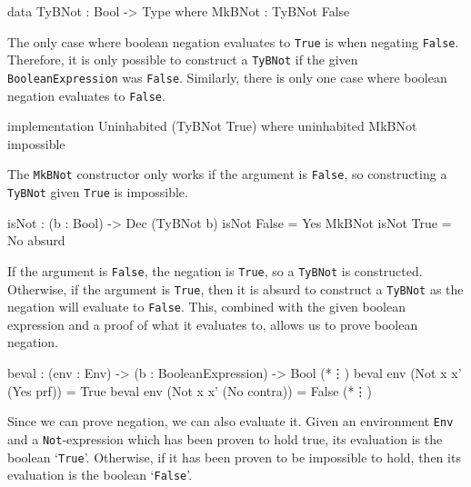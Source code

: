     \begin{code}[caption={The case where \texttt{Not} would evaluate to \texttt{True}}]
            data TyBNot : Bool -> Type where
                MkBNot  : TyBNot False
    \end{code}
    
    The only case where boolean negation evaluates to \texttt{True} is when negating \texttt{False}. Therefore, it is only possible to construct a \texttt{TyBNot} if the given \texttt{BooleanExpression} was \texttt{False}.
    Similarly, there is only one case where boolean negation evaluates to \texttt{False}.
    
    \begin{code}[caption={The \texttt{uninhabited} case for constructing a \texttt{TyBNot}}]
        implementation Uninhabited (TyBNot True) where
            uninhabited MkBNot impossible
    \end{code}
    
    The \texttt{MkBNot} constructor only works if the argument is \texttt{False}, so constructing a \texttt{TyBNot} given \texttt{True} is impossible.
    
    \begin{code}[caption={Decidability rules for \texttt{Not}}]
        isNot : (b : Bool) -> Dec (TyBNot b)
        isNot False = Yes MkBNot
        isNot True  = No absurd
    \end{code}
    
    If the argument is \texttt{False}, the negation is \texttt{True}, so a \texttt{TyBNot} is constructed. Otherwise, if the argument is \texttt{True}, then it is absurd to construct a \texttt{TyBNot} as the negation will evaluate to \texttt{False}. This, combined with the given boolean expression and a proof of what it evaluates to, allows us to prove boolean negation.

    \begin{code}[caption={\texttt{beval} for \texttt{Not}}, escapeinside={(*}{*)}]
        beval : (env : Env) -> (b : BooleanExpression) -> Bool
            (*\vdots*)
        beval env (Not x x' (Yes prf))   = True
        beval env (Not x x' (No contra)) = False
            (*\vdots*)
    \end{code}
    
    Since we can prove negation, we can also evaluate it. Given an environment \texttt{Env} and a \texttt{Not}-expression which has been proven to hold true, its evaluation is the boolean `\texttt{True}'. Otherwise, if it has been proven to be impossible to hold, then its evaluation is the boolean `\texttt{False}'.

